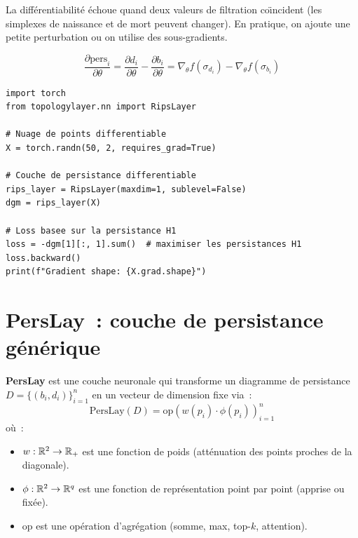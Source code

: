 \begin{attention}[title=\textbf{Points de non-diff\'erentiabilit\'e}]
La diff\'erentiabilit\'e \'echoue quand deux valeurs de filtration
co\"\i ncident (les simplexes de naissance et de mort peuvent
changer). En pratique, on ajoute une petite perturbation ou on
utilise des sous-gradients.
\end{attention}

\begin{formules}[title=\textbf{Gradient de la persistance}]
\[
  \frac{\partial \mathrm{pers}_i}{\partial \theta}
  = \frac{\partial d_i}{\partial \theta}
  - \frac{\partial b_i}{\partial \theta}
  = \nabla_\theta f(\sigma_{d_i}) - \nabla_\theta f(\sigma_{b_i})
\]
\end{formules}

\begin{verbatim}
import torch
from topologylayer.nn import RipsLayer

# Nuage de points differentiable
X = torch.randn(50, 2, requires_grad=True)

# Couche de persistance differentiable
rips_layer = RipsLayer(maxdim=1, sublevel=False)
dgm = rips_layer(X)

# Loss basee sur la persistance H1
loss = -dgm[1][:, 1].sum()  # maximiser les persistances H1
loss.backward()
print(f"Gradient shape: {X.grad.shape}")
\end{verbatim}

\section{PersLay~: couche de persistance g\'en\'erique}
\label{sec:perslay}

\begin{definition}
\textbf{PersLay} est une couche neuronale qui transforme un
diagramme de persistance $D = \{(b_i, d_i)\}_{i=1}^n$ en un
vecteur de dimension fixe via~:
\[
  \mathrm{PersLay}(D) = \mathrm{op}\!\left(
  w(p_i) \cdot \phi(p_i)\right)_{i=1}^n
\]
o\`u~:
\begin{itemize}
  \item $w : \mathbb{R}^2 \to \mathbb{R}_+$ est une fonction de poids
        (att\'enuation des points proches de la diagonale).
  \item $\phi : \mathbb{R}^2 \to \mathbb{R}^q$ est une fonction de
        repr\'esentation point par point (apprise ou fix\'ee).
  \item $\mathrm{op}$ est une op\'eration d'agr\'egation
        (somme, max, top-$k$, attention).
\end{itemize}
\end{definition}

